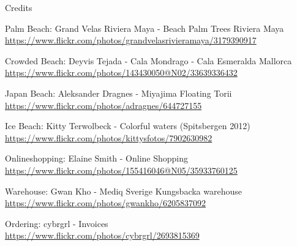 \begin{frame}{Credits}

Palm Beach: Grand Velas Riviera Maya - Beach Palm Trees Riviera Maya \\
{\footnotesize \url{https://www.flickr.com/photos/grandvelasrivieramaya/3179390917}}

Crowded Beach: Deyvis Tejada - Cala Mondrago - Cala Esmeralda Mallorca  \\
{\footnotesize \url{https://www.flickr.com/photos/143430050@N02/33639336432}}

Japan Beach: Aleksander Dragnes - Miyajima Floating Torii  \\
{\footnotesize \url{https://www.flickr.com/photos/adragnes/644727155}}

Ice Beach: Kitty Terwolbeck - Colorful waters (Spitsbergen 2012)  \\
{\footnotesize \url{https://www.flickr.com/photos/kittysfotos/7902630982}}

Onlineshopping: Elaine Smith - Online Shopping \\
{\footnotesize \url{https://www.flickr.com/photos/155416046@N05/35933760125}}

Warehouse: Gwan Kho - Mediq Sverige Kungsbacka warehouse \\
{\footnotesize \url{https://www.flickr.com/photos/gwankho/6205837092}}

Ordering: cybrgrl - Invoices \\
{\footnotesize \url{https://www.flickr.com/photos/cybrgrl/2693815369}}


{\footnotesize \url{}}
{\footnotesize \url{}}
{\footnotesize \url{}}

\end{frame}


